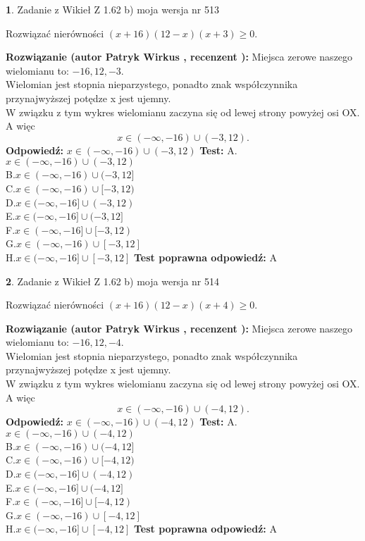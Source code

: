 \documentclass[12pt, a4paper]{article}
\theoremstyle{definition} %
\newtheorem{zad}{}
\newcommand{\zadStart}[1]{\begin{zad}#1\newline}
\newcommand{\zadStop}{\end{zad}}
\newcommand{\rozwStart}[2]{\noindent \textbf{Rozwiązanie (autor #1 , recenzent #2): }\newline}
\newcommand{\rozwStop}{\newline}
\newcommand{\odpStart}{\noindent \textbf{Odpowiedź:}\newline}
\newcommand{\odpStop}{\newline}
\newcommand{\testStart}{\noindent \textbf{Test:}\newline}
\newcommand{\testStop}{\newline}
\newcommand{\kluczStart}{\noindent \textbf{Test poprawna odpowiedź:}\newline}
\newcommand{\kluczStop}{\newline}
\begin{document}
\zadStart{Zadanie z Wikieł Z 1.62 b) moja wersja nr 513}

Rozwiązać nierówności $(x+16)(12-x)(x+3)\ge0$.
\zadStop
\rozwStart{Patryk Wirkus}{}
Miejsca zerowe naszego wielomianu to: $-16, 12, -3$.\\
Wielomian jest stopnia nieparzystego, ponadto znak współczynnika przy\linebreak najwyższej potędze x jest ujemny.\\ W związku z tym wykres wielomianu zaczyna się od lewej strony powyżej osi OX. A więc $$x \in (-\infty,-16) \cup (-3,12).$$
\rozwStop
\odpStart
$x \in (-\infty,-16) \cup (-3,12)$
\odpStop
\testStart
A.$x \in (-\infty,-16) \cup (-3,12)$\\
B.$x \in (-\infty,-16) \cup (-3,12]$\\
C.$x \in (-\infty,-16) \cup [-3,12)$\\
D.$x \in (-\infty,-16] \cup (-3,12)$\\
E.$x \in (-\infty,-16] \cup (-3,12]$\\
F.$x \in (-\infty,-16] \cup [-3,12)$\\
G.$x \in (-\infty,-16) \cup [-3,12]$\\
H.$x \in (-\infty,-16] \cup [-3,12]$
\testStop
\kluczStart
A
\kluczStop



\zadStart{Zadanie z Wikieł Z 1.62 b) moja wersja nr 514}

Rozwiązać nierówności $(x+16)(12-x)(x+4)\ge0$.
\zadStop
\rozwStart{Patryk Wirkus}{}
Miejsca zerowe naszego wielomianu to: $-16, 12, -4$.\\
Wielomian jest stopnia nieparzystego, ponadto znak współczynnika przy\linebreak najwyższej potędze x jest ujemny.\\ W związku z tym wykres wielomianu zaczyna się od lewej strony powyżej osi OX. A więc $$x \in (-\infty,-16) \cup (-4,12).$$
\rozwStop
\odpStart
$x \in (-\infty,-16) \cup (-4,12)$
\odpStop
\testStart
A.$x \in (-\infty,-16) \cup (-4,12)$\\
B.$x \in (-\infty,-16) \cup (-4,12]$\\
C.$x \in (-\infty,-16) \cup [-4,12)$\\
D.$x \in (-\infty,-16] \cup (-4,12)$\\
E.$x \in (-\infty,-16] \cup (-4,12]$\\
F.$x \in (-\infty,-16] \cup [-4,12)$\\
G.$x \in (-\infty,-16) \cup [-4,12]$\\
H.$x \in (-\infty,-16] \cup [-4,12]$
\testStop
\kluczStart
A
\kluczStop
\end{document}
